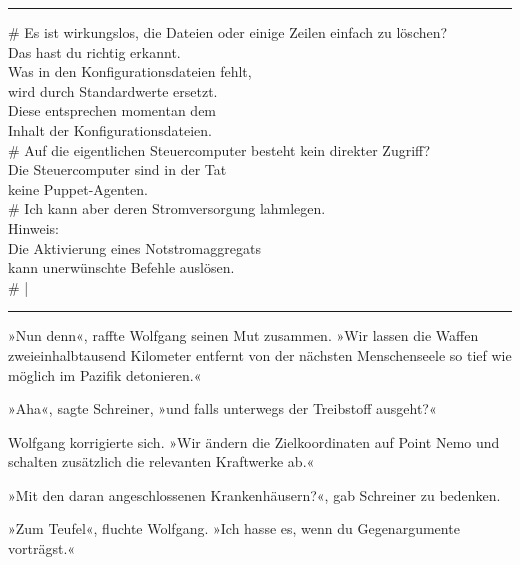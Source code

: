\noindent \parbox{\textwidth}{ \vspace{3ex} \hrule \vspace{3ex}

    \begin{tiny}
    \begin{ttfamily}

\noindent \# Es ist wirkungslos, die Dateien oder einige Zeilen einfach zu löschen?\\
\noindent Das hast du richtig erkannt.\\
\noindent Was in den Konfigurationsdateien fehlt,\\
\noindent wird durch Standardwerte ersetzt.\\
\noindent Diese entsprechen momentan dem\\
\noindent Inhalt der Konfigurationsdateien.\\
\noindent \# Auf die eigentlichen Steuercomputer besteht kein direkter Zugriff?\\
\noindent Die Steuercomputer sind in der Tat\\
\noindent keine Puppet-Agenten.\\
\noindent \# Ich kann aber deren Stromversorgung lahmlegen.\\
\noindent Hinweis:\\
\noindent Die Aktivierung eines Notstromaggregats\\
\noindent kann unerwünschte Befehle auslösen.\\
\noindent \# |

    \end{ttfamily}
    \end{tiny}

\vspace{3ex} \hrule \vspace{3ex} }

»Nun denn«, raffte Wolfgang seinen Mut zusammen. »Wir lassen die Waffen zweieinhalbtausend Kilometer entfernt von der nächsten Menschenseele so tief wie möglich im Pazifik detonieren.«

»Aha«, sagte Schreiner, »und falls unterwegs der Treibstoff ausgeht?«

Wolfgang korrigierte sich. »Wir ändern die Zielkoordinaten auf Point Nemo und schalten zusätzlich die relevanten Kraftwerke ab.«

»Mit den daran angeschlossenen Krankenhäusern?«, gab Schreiner zu bedenken.

»Zum Teufel«, fluchte Wolfgang. »Ich hasse es, wenn du Gegenargumente vorträgst.«

